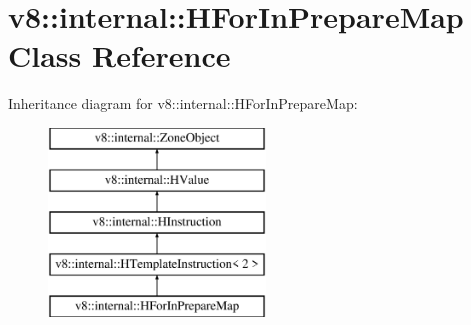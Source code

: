 \hypertarget{classv8_1_1internal_1_1_h_for_in_prepare_map}{}\section{v8\+:\+:internal\+:\+:H\+For\+In\+Prepare\+Map Class Reference}
\label{classv8_1_1internal_1_1_h_for_in_prepare_map}
Inheritance diagram for v8\+:\+:internal\+:\+:H\+For\+In\+Prepare\+Map\+:\begin{figure}[H]
\begin{center}
\leavevmode
\includegraphics[height=5.000000cm]{classv8_1_1internal_1_1_h_for_in_prepare_map}
\end{center}
\end{figure}
